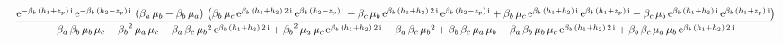 \documentclass[9pt]{article}
\begin{document}
  \begin{equation}
    \centering
    -\frac{\mathrm{e}^{- \mathrm{\beta}_{b}\, \left(h_{1} + z_{p}\right)\, \mathrm{i}}\, \mathrm{e}^{- \mathrm{\beta}_{b}\, \left(h_{2} - z_{p}\right)\, \mathrm{i}}\, \left(\mathrm{\beta}_{a}\, \mathrm{\mu}_{b} - \mathrm{\beta}_{b}\, \mathrm{\mu}_{a}\right)\, \left(\mathrm{\beta}_{b}\, \mathrm{\mu}_{c}\, \mathrm{e}^{\mathrm{\beta}_{b}\, \left(h_{1} + h_{2}\right)\, 2\, \mathrm{i}}\, \mathrm{e}^{\mathrm{\beta}_{b}\, \left(h_{2} - z_{p}\right)\, \mathrm{i}} + \mathrm{\beta}_{c}\, \mathrm{\mu}_{b}\, \mathrm{e}^{\mathrm{\beta}_{b}\, \left(h_{1} + h_{2}\right)\, 2\, \mathrm{i}}\, \mathrm{e}^{\mathrm{\beta}_{b}\, \left(h_{2} - z_{p}\right)\, \mathrm{i}} + \mathrm{\beta}_{b}\, \mathrm{\mu}_{c}\, \mathrm{e}^{\mathrm{\beta}_{b}\, \left(h_{1} + h_{2}\right)\, \mathrm{i}}\, \mathrm{e}^{\mathrm{\beta}_{b}\, \left(h_{1} + z_{p}\right)\, \mathrm{i}} - \mathrm{\beta}_{c}\, \mathrm{\mu}_{b}\, \mathrm{e}^{\mathrm{\beta}_{b}\, \left(h_{1} + h_{2}\right)\, \mathrm{i}}\, \mathrm{e}^{\mathrm{\beta}_{b}\, \left(h_{1} + z_{p}\right)\, \mathrm{i}}\right)}{\mathrm{\beta}_{a}\, \mathrm{\beta}_{b}\, \mathrm{\mu}_{b}\, \mathrm{\mu}_{c} - {\mathrm{\beta}_{b}}^2\, \mathrm{\mu}_{a}\, \mathrm{\mu}_{c} + \mathrm{\beta}_{a}\, \mathrm{\beta}_{c}\, {\mathrm{\mu}_{b}}^2\, \mathrm{e}^{\mathrm{\beta}_{b}\, \left(h_{1} + h_{2}\right)\, 2\, \mathrm{i}} + {\mathrm{\beta}_{b}}^2\, \mathrm{\mu}_{a}\, \mathrm{\mu}_{c}\, \mathrm{e}^{\mathrm{\beta}_{b}\, \left(h_{1} + h_{2}\right)\, 2\, \mathrm{i}} - \mathrm{\beta}_{a}\, \mathrm{\beta}_{c}\, {\mathrm{\mu}_{b}}^2 + \mathrm{\beta}_{b}\, \mathrm{\beta}_{c}\, \mathrm{\mu}_{a}\, \mathrm{\mu}_{b} + \mathrm{\beta}_{a}\, \mathrm{\beta}_{b}\, \mathrm{\mu}_{b}\, \mathrm{\mu}_{c}\, \mathrm{e}^{\mathrm{\beta}_{b}\, \left(h_{1} + h_{2}\right)\, 2\, \mathrm{i}} + \mathrm{\beta}_{b}\, \mathrm{\beta}_{c}\, \mathrm{\mu}_{a}\, \mathrm{\mu}_{b}\, \mathrm{e}^{\mathrm{\beta}_{b}\, \left(h_{1} + h_{2}\right)\, 2\, \mathrm{i}}}
    \label{eq:X2}
  \end{equation}
\end{document}
